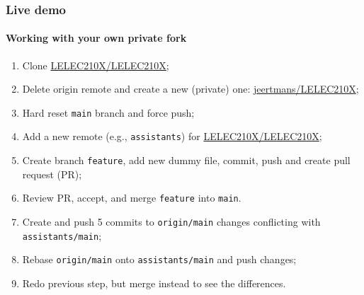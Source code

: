 \documentclass[t, aspectratio=169, english, table]{_style/tudelft-beamer}
\begin{document}
\begin{frame}
  \frametitle{Live demo}
  \framesubtitle{Working with your own private fork}

  \begin{enumerate}
    \item Clone \href{https://github.com/LELEC210X/LELEC210X}{\color{tud primary}LELEC210X/LELEC210X};
    \item Delete origin remote and create a new (private) one:  \href{https://github.com/jeertmans/LELEC210X}{\color{tud primary}jeertmans/LELEC210X};
    \item Hard reset \texttt{main} branch and force push;
    \item Add a new remote (e.g., \texttt{assistants}) for \href{https://github.com/LELEC210X/LELEC210X}{\color{tud primary}LELEC210X/LELEC210X};
    \item Create branch \texttt{feature}, add new dummy file, commit, push and create pull request (PR);
    \item Review PR, accept, and merge \texttt{feature} into \texttt{main}.
    \item Create and push 5 commits to \texttt{origin/main} changes conflicting with \texttt{assistants/main};
    \item Rebase \texttt{origin/main} onto \texttt{assistants/main} and push changes;
    \item Redo previous step, but merge instead to see the differences.
  \end{enumerate}
\end{frame}
\end{document}
